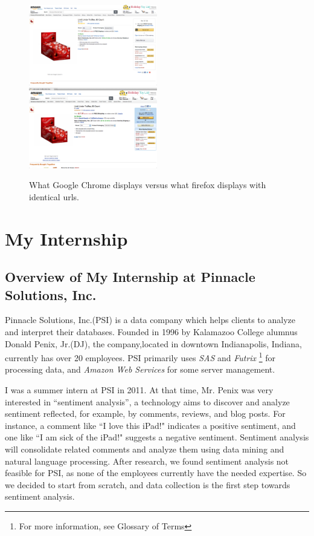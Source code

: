 \documentclass[12pt]{report}
\begin{document}
\begin{figure}[htp]
\includegraphics[width=0.5\textwidth]{lindt_chrome.png}
\includegraphics[width=0.5\textwidth]{lindt_firefox.png}
\caption[Comparison of same url in different browsers]
{What Google Chrome displays versus what firefox displays with identical urls.}
\end{figure}


\chapter{My Internship}
\section{Overview of My Internship at Pinnacle Solutions, Inc.}
Pinnacle Solutions, Inc.(PSI) is a data company which helps clients to analyze and interpret their databases. Founded in 1996 by Kalamazoo College alumnus Donald Penix, Jr.(DJ), the company,located in downtown Indianapolis, Indiana, currently has over 20 employees. PSI primarily uses \textit{SAS} and \textit{Futrix} \footnote{For more information, see Glossary of Terms} for processing data, and \textit{Amazon Web Services} for some server management.

I was a summer intern at PSI in 2011. At that time, Mr. Penix was very interested in ``sentiment analysis'', a technology aims to discover and analyze sentiment reflected, for example, by comments, reviews, and blog posts. For instance, a comment like ``I love this iPad!" indicates a positive sentiment, and one like ``I am sick of the iPad!" suggests a negative sentiment. Sentiment analysis will consolidate related comments and analyze them using data mining and natural language processing. After research, we found sentiment analysis not feasible for PSI, as none of the employees currently have the needed expertise. So we decided to start from scratch, and data collection is the first step towards sentiment analysis.
\end{document}
